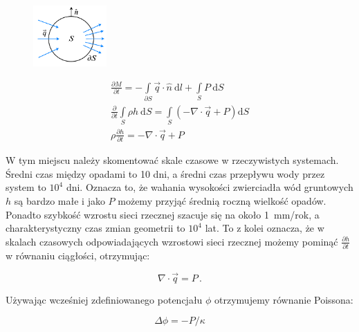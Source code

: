 \documentclass[]{pracamgr}
\begin{document}
      \begin{figure}
        \vspace{-8pt}
        \includegraphics[width=0.25\textwidth]{figs/zachowanie_masy.png}
        \vspace{-15pt}
        \caption{}
        \vspace{-1000pt}
        \label{zachowanie_masy}
      \end{figure}

      \begin{gather*}
        \frac{\partial M}{\partial t}=- \int\limits_{\partial S} \vec{q}\cdot \hat{n} \ \textrm{d}l + \int\limits_S P \ \textrm{d}S
        \\
        \frac{\partial}{\partial t} \int\limits_S \rho h \ \textrm{d}S=\int\limits_S \left(-\nabla \cdot \vec{q} + P\right)\textrm{d}S
        \\
        \rho \frac{\partial h}{\partial t}=-\nabla \cdot \vec{q} + P
      \end{gather*}	

      W tym miejscu należy skomentować skale czasowe w rzeczywistych systemach. Średni czas między opadami to 10 dni, a średni czas przepływu wody przez system to $10^4$ dni. Oznacza to, że wahania wysokości zwierciadła wód gruntowych $h$ są bardzo małe i jako $P$ możemy przyjąć średnią roczną wielkość opadów. Ponadto szybkość wzrostu sieci rzecznej szacuje się na około 1~mm/rok, a charakterystyczny czas zmian geometrii to $10^4$ lat. To z kolei oznacza, że w skalach czasowych odpowiadających wzrostowi sieci rzecznej możemy pominąć $ \frac{\partial h} {\partial t} $ w równaniu ciągłości, otrzymując:
      
      \begin{equation}
    		\nabla \cdot \vec{q} = P \,.
    	\end{equation}
      
      Używając wcześniej zdefiniowanego potencjału $\phi$ otrzymujemy równanie Poissona:
      
      \begin{equation}
        \label{poisson}
    		\Delta \phi = -P/\kappa
    	\end{equation}
      
\end{document}
